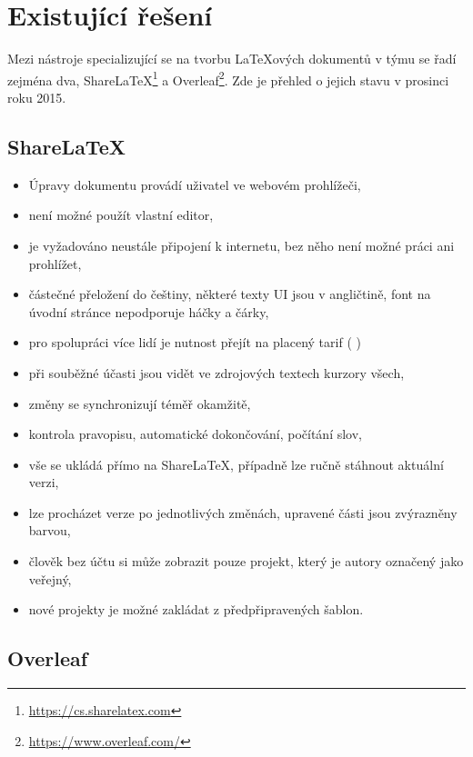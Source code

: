 \section{Existující řešení}

Mezi nástroje specializující se na tvorbu \LaTeX{ových} dokumentů v týmu se řadí zejména dva, ShareLaTeX\footnote{\url{https://cs.sharelatex.com}} a Overleaf\footnote{\url{https://www.overleaf.com/}}. Zde je přehled o jejich stavu v prosinci roku 2015.

\subsection{ShareLaTeX}

\begin{itemize}
	\item Úpravy dokumentu provádí uživatel ve webovém prohlížeči,
	\item není možné použít vlastní editor,
	\item je vyžadováno neustále připojení k internetu, bez něho není možné práci ani prohlížet,
	\item částečné přeložení do češtiny, některé texty UI jsou v angličtině, font na úvodní stránce nepodporuje háčky a čárky,
	\item pro spolupráci více lidí je nutnost přejít na placený tarif ( \cite{sharelatex-pricing})
	\item při souběžné účasti jsou vidět ve zdrojových textech kurzory všech,
	\item změny se synchronizují téměř okamžitě,
	\item kontrola pravopisu, automatické dokončování, počítání slov,
	\item vše se ukládá přímo na ShareLaTeX, případně lze ručně stáhnout aktuální verzi,
	\item lze procházet verze po jednotlivých změnách, upravené části jsou zvýrazněny barvou,
	\item člověk bez účtu si může zobrazit pouze projekt, který je autory označený jako veřejný,
	\item nové projekty je možné zakládat z předpřipravených šablon.
\end{itemize}


\subsection{Overleaf}


